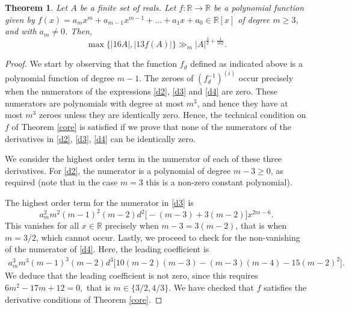 \documentclass[11pt]{amsart}
\newcommand{\R}{\mathbb{R}}
\newtheorem{theorem}{Theorem}[section]
\begin{document}
\begin{theorem}\label{generalpoly}
    Let $A$ be a finite set of reals. Let $f:\R\rightarrow\R$ be a polynomial function given by $f(x)= a_mx^m+a_{m-1}
x^{m-1}+\dotsc+a_1x+a_0\in\R[x]$ of degree $m\ge3$, and with $a_m\neq0$. Then, 
  \[
    \max \{|16A|, |13f(A)| \} \gg_m |A|^{\frac{3}{2} +\frac{1}{162}}.
    \]
\end{theorem}
\begin{proof}
    We start by observing that the function $f_d$ defined as indicated above is a polynomial function of degree $m-1$. The zeroes of $(f_d^{-1})^{(i)}$ occur precisely when the numerators of the expressions \eqref{d2}, \eqref{d3} and \eqref{d4} are zero. These numerators are polynomials with degree at most $m^3$, and hence they have at most $m^3$ zeroes unless they are identically zero. Hence, the technical condition on $f$ of Theorem \ref{core} is satisfied if we prove that none of the numerators of the derivatives in \eqref{d2}, \eqref{d3}, \eqref{d4} can be identically zero. 
    
    We consider the highest order term in the numerator of each of these three derivatives. For \eqref{d2}, the numerator is a polynomial of degree $m-3 \geq 0$, as required (note that in the case $m=3$ this is a non-zero constant polynomial). 

    The highest order term for the numerator in \eqref{d3} is 
     \begin{equation*}
        a_m^2m^2(m-1)^2(m-2)d^2\Big[-(m-3)+3(m-2)\Big]x^{2m-6}.
    \end{equation*}
    This vanishes for all $x\in \R$ precisely when $m-3=3(m-2)$, that is when $m=3/2$, which cannot occur. Lastly, we proceed to check for the non-vanishing of the numerator of \eqref{d4}. Here, the leading coefficient is \begin{equation*}
        \begin{split}
            a_m^3m^3(m-1)^3(m-2)d^3\Big[10(m-2)(m-3)-(m-3)(m-4)-15(m-2)^2\Big].
        \end{split}
    \end{equation*}
    We deduce that the leading coefficient is not zero, since this requires $6m^2-17m+12=0,$ that is $m\in\{3/2,4/3\}$. We have checked that $f$ satisfies the derivative conditions of Theorem \ref{core}. 
    

\end{proof}
\end{document}

